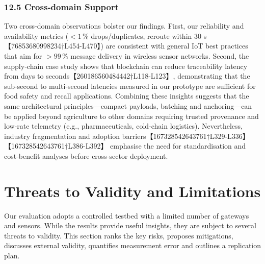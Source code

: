 \documentclass[12pt,onecolumn]{IEEEtran} %
\begin{document}
\subsubsection*{12.5 Cross‑domain Support}
 Two cross‑domain observations bolster our findings.  First, our reliability and availability metrics (\(<1\,\%\) drops/duplicates, reroute within 30 s【76853680998234†L454-L470】) are consistent with general IoT best practices that aim for \(>99\,\%\) message delivery in wireless sensor networks.  Second, the supply‑chain case study shows that blockchain can reduce traceability latency from days to seconds【260186560484442†L118-L123】, demonstrating that the sub‑second to multi‑second latencies measured in our prototype are sufficient for food safety and recall applications.  Combining these insights suggests that the same architectural principles—compact payloads, batching and anchoring—can be applied beyond agriculture to other domains requiring trusted provenance and low‑rate telemetry (e.g., pharmaceuticals, cold‑chain logistics).  Nevertheless, industry fragmentation and adoption barriers【167328542643761†L329-L336】【167328542643761†L386-L392】 emphasise the need for standardisation and cost‑benefit analyses before cross‑sector deployment.

\section{Threats to Validity and Limitations}
\label{sec:threats}

Our evaluation adopts a controlled testbed with a limited number of gateways and sensors.  While the results provide useful insights, they are subject to several threats to validity.  This section ranks the key risks, proposes mitigations, discusses external validity, quantifies measurement error and outlines a replication plan.
\end{document}
